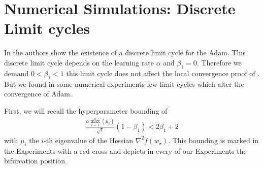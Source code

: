 \documentclass[runningheads]{llncs}
\def\learningrate{\alpha}
\def\weightstar{w_\star}
\begin{document}
\section{Numerical Simulations: Discrete Limit cycles}
In \cite[Proposition 3.3]{daSilva.2018} the authors show the existence of a discrete limit cycle for the Adam. This discrete limit cycle depends on the learning rate $\learningrate$ and $\beta_1 = 0$. Therefore we demand $0 < \beta_1 < 1$ this limit cycle does not affect the local convergence proof of \cite{BockWeiss.2019}. But we found in some numerical experiments few limit cycles which alter the convergence of Adam.

First, we will recall the hyperparameter bounding of \cite{BockWeiss.2019}
\begin{align}
\label{eq:Our_inequality}
\frac{\learningrate \max_{i=1}^n (\mu_i)}{\sqrt{\epsilon}} \left( 1-\beta_1 \right) < 2 \beta_1 +2
\end{align}
with $\mu_i$ the $i$-th eigenvalue of the Hessian $\nabla^2f(\weightstar)$. This bounding is marked in the Experiments with a red cross and depicts in every of our Experiments the bifurcation position.
\end{document}
